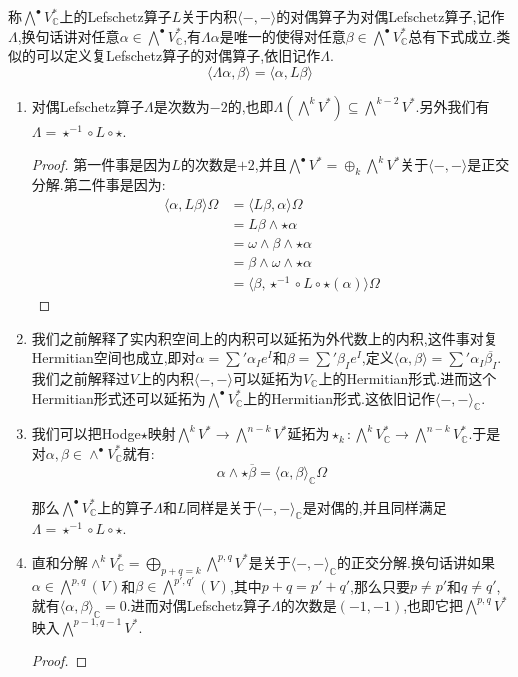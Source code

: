 \begin{enumerate}
    \qquad
    
    称$\bigwedge^{\bullet}V_{\mathbb{C}}^*$上的Lefschetz算子$L$关于内积$\langle-,-\rangle$的对偶算子为对偶Lefschetz算子,记作$\Lambda$,换句话讲对任意$\alpha\in\bigwedge^{\bullet}V_{\mathbb{C}}^*$,有$\Lambda\alpha$是唯一的使得对任意$\beta\in\bigwedge^{\bullet}V_{\mathbb{C}}^*$总有下式成立.类似的可以定义复Lefschetz算子的对偶算子,依旧记作$\Lambda$.
    $$\langle\Lambda\alpha,\beta\rangle=\langle\alpha,L\beta\rangle$$
    \begin{enumerate}[(1)]
    	\item 对偶Lefschetz算子$\Lambda$是次数为$-2$的,也即$\Lambda\left(\bigwedge^kV^*\right)\subseteq\bigwedge^{k-2}V^*$.另外我们有$\Lambda=\star^{-1}\circ L\circ\star$.
    	\begin{proof}
    		
    		第一件事是因为$L$的次数是$+2$,并且$\bigwedge^{\bullet}V^*=\oplus_k\bigwedge^kV^*$关于$\langle-,-\rangle$是正交分解.第二件事是因为:
    		\begin{align*}
    			\langle\alpha,L\beta\rangle\Omega&=\langle L\beta,\alpha\rangle\Omega\\
    			&=L\beta\wedge\star\alpha\\
    			&=\omega\wedge\beta\wedge\star\alpha\\
    			&=\beta\wedge\omega\wedge\star\alpha\\
    			&=\langle\beta,\star^{-1}\circ L\circ\star(\alpha)\rangle\Omega
    		\end{align*}
    	\end{proof}
        \item 我们之前解释了实内积空间上的内积可以延拓为外代数上的内积,这件事对复Hermitian空间也成立,即对$\alpha=\sum'\alpha_Ie^I$和$\beta=\sum'\beta_Ie^I$,定义$\langle\alpha,\beta\rangle=\sum'\alpha_I\overline{\beta_I}$.我们之前解释过$V$上的内积$\langle-,-\rangle$可以延拓为$V_{\mathbb{C}}$上的Hermitian形式.进而这个Hermitian形式还可以延拓为$\bigwedge^{\bullet}V_{\mathbb{C}}^*$上的Hermitian形式.这依旧记作$\langle-,-\rangle_{\mathbb{C}}$.
        \item 我们可以把Hodge$\star$映射$\bigwedge^kV^*\to\bigwedge^{n-k}V^*$延拓为$\star_k:\bigwedge^kV^*_{\mathbb{C}}\to\bigwedge^{n-k}V^*_{\mathbb{C}}$.于是对$\alpha,\beta\in\wedge^{\bullet}V_{\mathbb{C}}^*$就有:
        $$\alpha\wedge\star\overline{\beta}=\langle\alpha,\beta\rangle_{\mathbb{C}}\Omega$$
        
        那么$\bigwedge^{\bullet}V^*_{\mathbb{C}}$上的算子$\Lambda$和$L$同样是关于$\langle-,-\rangle_{\mathbb{C}}$是对偶的,并且同样满足$\Lambda=\star^{-1}\circ L\circ\star$.
        \item 直和分解$\wedge^kV_{\mathbb{C}}^*=\bigoplus_{p+q=k}\bigwedge^{p,q}V^*$是关于$\langle-,-\rangle_{\mathbb{C}}$的正交分解.换句话讲如果$\alpha\in\bigwedge^{p,q}(V)$和$\beta\in\bigwedge^{p',q'}(V)$,其中$p+q=p'+q'$,那么只要$p\not=p'$和$q\not=q'$,就有$\langle\alpha,\beta\rangle_{\mathbb{C}}=0$.进而对偶Lefschetz算子$\Lambda$的次数是$(-1,-1)$,也即它把$\bigwedge^{p,q}V^*$映入$\bigwedge^{p-1,q-1}V^*$.
        \begin{proof}
        	

\end{proof}
\end{enumerate}
\end{enumerate}
